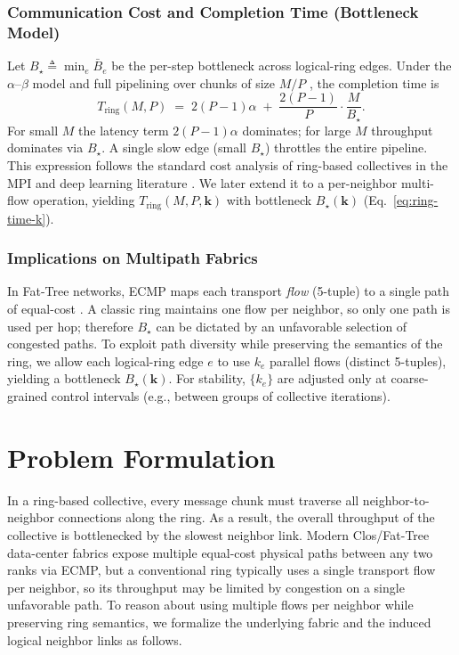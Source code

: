 \documentclass[12pt]{article}
\begin{document}
\subsubsection{Communication Cost and Completion Time (Bottleneck Model)}
Let $B_\star \triangleq \min_e \bar{B}_e$ be the per-step bottleneck across logical-ring edges.
Under the $\alpha$–$\beta$ model and full pipelining over chunks of size $M/P$ \cite{thakur2005collectives,sergeev2018horovod}, the completion time is
\begin{equation}
T_{\text{ring}}(M,P) \;=\; 2(P-1)\alpha \;+\; \frac{2(P-1)}{P}\cdot \frac{M}{B_\star}.
\label{eq:ring-time}
\end{equation}
For small $M$ the latency term $2(P-1)\alpha$ dominates; for large $M$ throughput dominates via $B_\star$.
A single slow edge (small $B_\star$) throttles the entire pipeline.
This expression follows the standard cost analysis of ring-based collectives in the MPI and deep learning literature \cite{thakur2005collectives,sergeev2018horovod,zong2025ibing}.
We later extend it to a per-neighbor multi-flow operation, yielding $T_{\text{ring}}(M,P,\mathbf{k})$ with bottleneck $B_\star(\mathbf{k})$ (Eq.~\ref{eq:ring-time-k}).



\subsubsection{Implications on Multipath Fabrics}
\label{sec:implications-multipath}
In Fat-Tree networks, ECMP maps each transport \emph{flow} (5-tuple) to a single path of equal-cost \cite{hopps2000rfc2992,leiserson1985fattree}.
A classic ring maintains one flow per neighbor, so only one path is used per hop; therefore $B_\star$ can be dictated by an unfavorable selection of congested paths.
To exploit path diversity while preserving the semantics of the ring, we allow each logical-ring edge $e$ to use $k_e$ parallel flows (distinct 5-tuples), yielding a bottleneck $B_\star(\mathbf{k})$.
For stability, $\{k_e\}$ are adjusted only at coarse-grained control intervals (e.g., between groups of collective iterations).


\section{Problem Formulation}
\label{sec:problem}
In a ring-based collective, every message chunk must traverse all neighbor-to-neighbor connections along the ring.
As a result, the overall throughput of the collective is bottlenecked by the slowest neighbor link.
Modern Clos/Fat-Tree data-center fabrics expose multiple equal-cost physical paths between any two ranks via ECMP, but a conventional ring typically uses a single transport flow per neighbor, so its throughput may be limited by congestion on a single unfavorable path.
To reason about using multiple flows per neighbor while preserving ring semantics, we formalize the underlying fabric and the induced logical neighbor links as follows.
\end{document}
